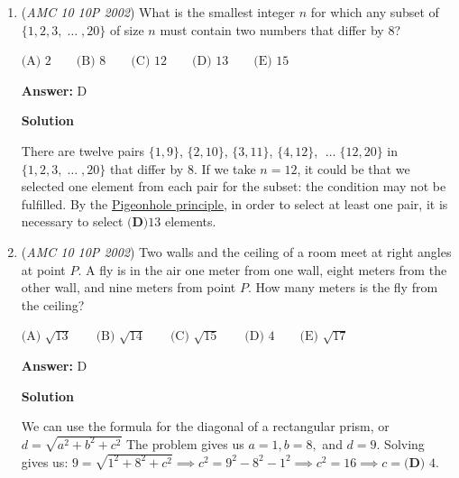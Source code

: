 \begin{enumerate}
\textbf{Solution 3}

Notice that $\triangle ICE \cong \triangle JDE$. This means calculating the area of $EIDJ$ is equivalent to calculating $[CED]$ (we can think of this as shifting $\triangle JDE$ to where $\triangle ICE$ is), so
 \[[EIDJ] = [CED] = \frac{1}{4} [ABCD] = \boxed{\textbf{(A) } \frac{1}{4}}\]. ~LQS

 


	\item (\textit{AMC 10 10P 2002}) What is the smallest integer $n$ for which any subset of $\{ 1, 2, 3, \; \dots \; , 20 \}$ of size $n$ must contain two numbers that differ by 8?


 $\text{(A) }2 \qquad \text{(B) }8 \qquad \text{(C) }12 \qquad \text{(D) }13 \qquad \text{(E) }15$

 \textbf{Answer: }D



\textbf{Solution}

There are twelve pairs $\{ 1, 9 \}$, $\{ 2, 10 \}$, $\{ 3, 11 \}$, $\{ 4, 12 \}$, $\; \dots \; \{ 12, 20 \}$ in $\{ 1, 2, 3, \; \dots \; , 20 \}$ that differ by 8. If we take $n = 12$, it could be that we selected one element from each pair for the subset: the condition may not be fulfilled. By the \href{https://artofproblemsolving.com/wiki/index.php?title=Pigeonhole\_principle}{Pigeonhole principle}, in order to select at least one pair, it is necessary to select $\boxed{\textbf{(D)} 13}$ elements.

 


	\item (\textit{AMC 10 10P 2002}) Two walls and the ceiling of a room meet at right angles at point $P.$  A fly is in the air one meter from one wall, eight meters from the other wall, and nine meters from point $P$. How many meters is the fly from the ceiling?


 $\text{(A) }\sqrt{13} \qquad \text{(B) }\sqrt{14} \qquad \text{(C) }\sqrt{15} \qquad \text{(D) }4 \qquad \text{(E) }\sqrt{17}$

 \textbf{Answer: }D



\textbf{Solution}

We can use the formula for the diagonal of a rectangular prism, or $d=\sqrt{a^2+b^2+c^2}$ The problem gives us $a=1, b=8,$ and $d=9.$ Solving gives us: $9=\sqrt{1^2 + 8^2 + c^2} \implies c^2=9^2-8^2-1^2 \implies c^2=16  \implies c=\boxed{\textbf{(D) } 4}.$




\end{enumerate}
